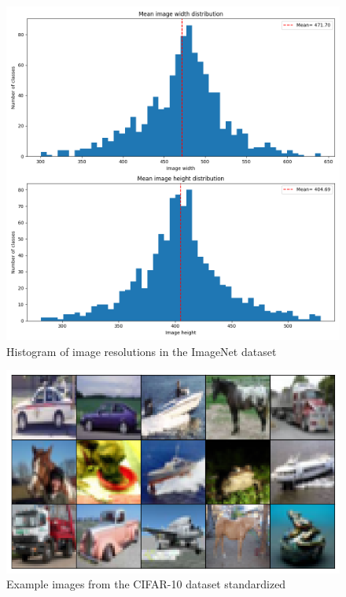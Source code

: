 \documentclass[10pt,a4paper,twoside]{article}
\begin{document}
\begin{figure}
    \centering
    \includegraphics[width=\textwidth]{../../sample_images/imagenet_sizes_histogram.png}
    \caption{Histogram of image resolutions in the ImageNet dataset}
    \label{fig:imnet_sizes_hist}
\end{figure}

\begin{figure}
    \centering
    \includegraphics[width=\textwidth]{../../sample_images/cifar_rbatch.png}
    \caption{Example images from the CIFAR-10 dataset standardized}
    \label{fig:cifar10_example_normalized}
\end{figure}
\end{document}

